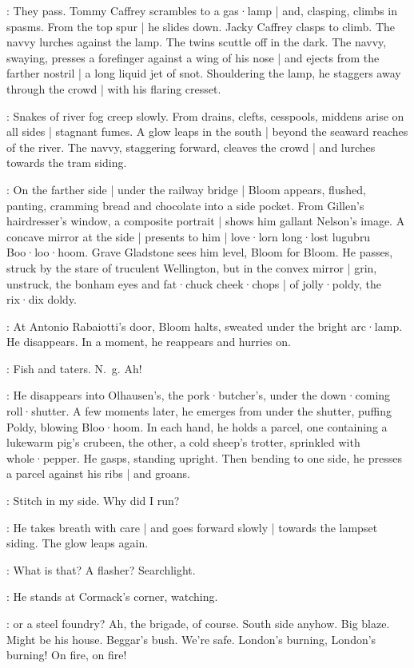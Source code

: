 :
They pass.
Tommy Caffrey scrambles to a gas·lamp |
and,
clasping,
climbs in spasms.
From the top spur |
he slides down.
Jacky Caffrey clasps to climb.
The navvy lurches against the lamp.
The twins scuttle off in the dark.
The navvy,
swaying,
presses a forefinger against a wing of his nose |
and ejects from the farther nostril |
a long liquid jet of snot.
Shouldering the lamp,
he staggers away through the crowd |
with his flaring cresset.

:
Snakes of river fog creep slowly.
From drains,
clefts,
cesspools,
middens arise on all sides |
stagnant fumes.
A glow leaps in the south |
beyond the seaward reaches of the river.
The navvy,
staggering forward,
cleaves the crowd |
and lurches towards the tram siding.

:
On the farther side |
under the railway bridge |
Bloom appears,
flushed,
panting,
cramming bread and chocolate into a side pocket.
From Gillen's hairdresser's window,
a composite portrait |
shows him gallant Nelson's image.
A concave mirror at the side |
presents to him |
love·lorn long·lost lugubru Boo·loo·hoom.
Grave Gladstone sees him level,
Bloom for Bloom.
He passes,
struck by the stare of truculent Wellington,
but in the convex mirror |
grin,
unstruck,
the bonham eyes and fat·chuck cheek·chops |
of jolly·poldy,
the rix·dix doldy.

:
At Antonio Rabaiotti's door,
Bloom halts,
sweated under the bright arc·lamp.
He disappears.
In a moment,
he reappears and hurries on.

\Bloom:
Fish and taters.
N.~g.
Ah!

:
He disappears into Olhausen's,
the pork·butcher's,
under the down·coming roll·shutter.
A few moments later,
he emerges from under the shutter,
puffing Poldy,
blowing Bloo·hoom.
In each hand,
he holds a parcel,
one containing a lukewarm pig's crubeen,
the other,
a cold sheep's trotter,
sprinkled with whole·pepper.
He gasps,
standing upright.
Then bending to one side,
he presses a parcel against his ribs |
and groans.

\Bloom:
Stitch in my side.
Why did I run?

:
He takes breath with care |
and goes forward slowly |
towards the lampset siding.
The glow leaps again.

\Bloom:
What is that?
A flasher?
Searchlight.

:
He stands at Cormack's corner,
watching.

\Bloom:
or a steel foundry?
Ah,
the brigade,
of course.
South side anyhow.
Big blaze.
Might be his house.
Beggar's bush.
We're safe.
London's burning,
London's burning!
On fire,
on fire!

